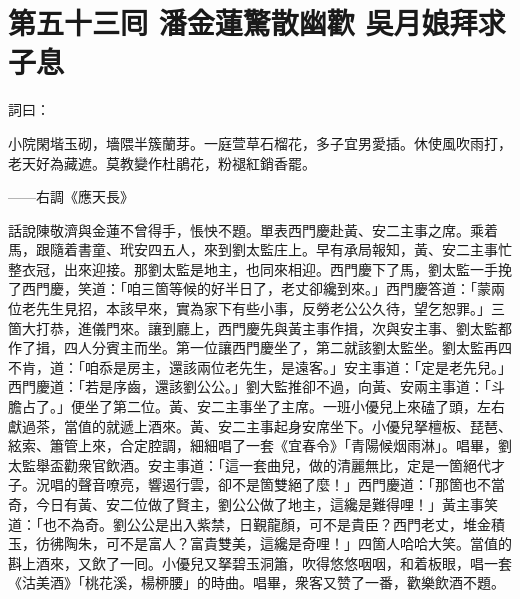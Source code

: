 
\chapter*{第五十三囘 潘金蓮驚散幽歡 吳月娘拜求子息}


詞曰：

小院閑堦玉砌，墻隈半簇蘭芽。一庭萱草石榴花，多子宜男愛插。休使風吹雨打，老天好為藏遮。莫教變作杜鵑花，粉褪紅銷香罷。

——右調《應天長》

話說陳敬濟與金蓮不曾得手，悵怏不題。單表西門慶赴黃、安二主事之席。乘着馬，跟隨着書童、玳安四五人，來到劉太監庄上。早有承局報知，黃、安二主事忙整衣冠，出來迎接。那劉太監是地主，也同來相迎。西門慶下了馬，劉太監一手挽了西門慶，笑道：「咱三箇等候的好半日了，老丈卻纔到來。」西門慶答道：「蒙兩位老先生見招，本該早來，實為家下有些小事，反勞老公公久待，望乞恕罪。」三箇大打恭，進儀門來。讓到廳上，西門慶先與黃主事作揖，次與安主事、劉太監都作了揖，四人分賓主而坐。第一位讓西門慶坐了，第二就該劉太監坐。劉太監再四不肯，道：「咱忝是房主，還該兩位老先生，是遠客。」安主事道：「定是老先兒。」西門慶道：「若是序齒，還該劉公公。」劉大監推卻不過，向黃、安兩主事道：「斗膽占了。」便坐了第二位。黃、安二主事坐了主席。一班小優兒上來磕了頭，左右獻過茶，當值的就遞上酒來。黃、安二主事起身安席坐下。小優兒拏檀板、琵琶、絃索、簫管上來，合定腔調，細細唱了一套《宜春令》「青陽候烟雨淋」。唱畢，劉太監舉盃勸衆官飲酒。安主事道：「這一套曲兒，做的清麗無比，定是一箇絕代才子。況唱的聲音嘹亮，響遏行雲，卻不是箇雙絕了麼！」西門慶道：「那箇也不當奇，今日有黃、安二位做了賢主，劉公公做了地主，這纔是難得哩！」黃主事笑道：「也不為奇。劉公公是出入紫禁，日覲龍顏，可不是貴臣？西門老丈，堆金積玉，彷彿陶朱，可不是富人？富貴雙美，這纔是奇哩！」{}四箇人哈哈大笑。當值的斟上酒來，又飲了一囘。小優兒又拏碧玉洞簫，吹得悠悠咽咽，和着板眼，唱一套《沽美酒》「桃花溪，楊桺腰」的時曲。唱畢，衆客又赞了一番，歡樂飲酒不題。

